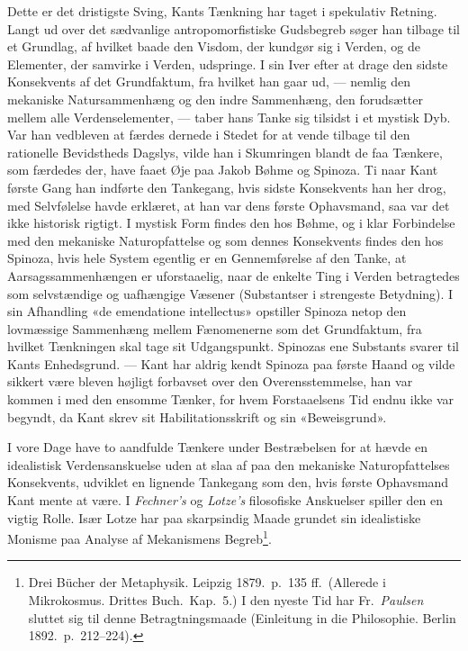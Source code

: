\documentclass[12pt,a4paper]{article}
\begin{document}
Dette er det dristigste Sving, Kants Tænkning har taget i spekulativ
Retning. Langt ud over det sædvanlige antropomorfistiske Gudsbegreb søger
han tilbage til et Grundlag, af hvilket baade den Visdom, der kundgør sig
i Verden, og de Elementer, der samvirke i Verden, udspringe. I sin Iver
efter at drage den sidste Konsekvents af det Grundfaktum, fra hvilket han
gaar ud, --- nemlig den mekaniske Natursammenhæng og den indre
Sammenhæng, den forudsætter mellem alle Verdenselementer, --- taber hans
Tanke sig tilsidst i et mystisk Dyb. Var han vedbleven at færdes dernede
i Stedet for at vende tilbage til den rationelle Bevidstheds Dagslys,
vilde han i Skumringen blandt de faa Tænkere, som færdedes der, have faaet
Øje paa Jakob Bøhme og Spinoza. Ti naar Kant første Gang han indførte den
Tankegang, hvis sidste Konsekvents han her drog, med Selvfølelse havde
erklæret, at han var dens første Ophavsmand, saa var det ikke historisk
rigtigt. I mystisk Form findes den hos Bøhme, og i klar Forbindelse med
den mekaniske Naturopfattelse og som dennes Konsekvents findes den hos
Spinoza, hvis hele System egentlig er en Gennemførelse af den Tanke, at
Aarsagssammenhængen er uforstaaelig, naar de enkelte Ting i Verden
betragtedes som selvstændige og uafhængige Væsener (Substantser i
strengeste Betydning). I sin Afhandling «de emendatione intellectus»
opstiller Spinoza netop den lovmæssige Sammenhæng mellem Fænomenerne som
det Grundfaktum, fra hvilket Tænkningen skal tage sit Udgangspunkt.
Spinozas ene Substants svarer til Kants Enhedsgrund. --- Kant har aldrig
kendt Spinoza paa første Haand og vilde sikkert være bleven højligt
forbavset over den Overensstemmelse, han var kommen i med den ensomme
Tænker, for hvem Forstaaelsens Tid endnu ikke var begyndt, da Kant skrev
sit Habilitationsskrift og sin «Beweisgrund».

I vore Dage have to aandfulde Tænkere under Bestræbelsen for at hævde en
idealistisk Verdensanskuelse uden at slaa af paa den mekaniske
Naturopfattelses Konsekvents, udviklet en lignende Tankegang som den,
hvis første Ophavsmand Kant mente at være. I \emph{Fechner's} og \emph{Lotze's}
filosofiske Anskuelser spiller den en vigtig Rolle. Især Lotze har paa
skarpsindig Maade grundet sin idealistiske Monisme paa Analyse af
Mekanismens Begreb\footnote{Drei Bücher der Metaphysik. Leipzig
1879.\ p.\ 135 ff.\ (Allerede i Mikrokosmus. Drittes Buch.\ Kap.\
5.) I den nyeste Tid har Fr.\ \emph{Paulsen} sluttet sig til denne
Betragtningsmaade (Einleitung in die Philosophie. Berlin 1892.\
p.\ 212--224).}.
\end{document}
